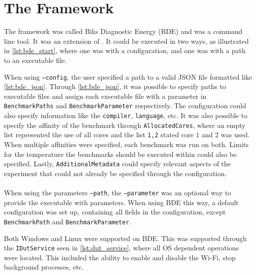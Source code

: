 \section{The Framework}\label{app:framework}

The framework was called Biks Diagnostic Energy (BDE) and was a command line tool. It was an extension of \cite{biksbois}. It could be executed in two ways, as illustrated in \cref{lst:bde_start}, where one was with a configuration, and one was with a path to an executable file.



When using \texttt{--config}, the user specified a path to a valid JSON file formatted like \cref{lst:bde_json}. Through \cref{lst:bde_json}, it was possible to specify paths to executable files and assign each executable file with a parameter in \texttt{BenchmarkPaths} and \texttt{BenchmarkParameter} respectively. The configuration could also specify information like the \texttt{compiler}, \texttt{language}, etc. It was also possible to specify the affinity of the benchmark through \texttt{AllocatedCores}, where an empty list represented the use of all cores and the list \texttt{1,2} stated core $1$ and $2$ was used. When multiple affinities were specified, each benchmark was run on both. Limits for the temperature the benchmarks should be executed within could also be specified. Lastly, \texttt{AdditionalMetadata} could specify relevant aspects of the experiment that could not already be specified through the configuration.



\paragraph*{}
When using the parameters \texttt{--path}, the \texttt{--parameter} was an optional way to provide the executable with parameters. When using BDE this way, a default configuration was set up, containing all fields in the configuration, except \texttt{BenchmarkPath} and \texttt{BenchmarkParameter}.
\newpage



Both Windows and Linux were supported on BDE. This was supported through the \texttt{IDutService} seen in \cref{lst:dut_service}, where all OS dependent operations were located. This included the ability to enable and disable the Wi-Fi, stop background processes, etc.

